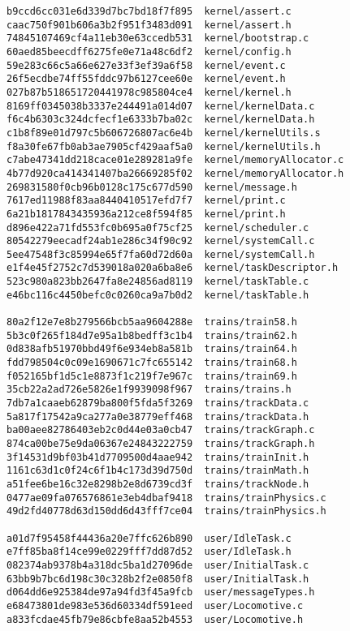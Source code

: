 \documentclass[twoside,a4paper]{refart}
\begin{document}
\begin{verbatim}
b9ccd6cc031e6d339d7bc7bd18f7f895  kernel/assert.c
caac750f901b606a3b2f951f3483d091  kernel/assert.h
74845107469cf4a11eb30e63ccedb531  kernel/bootstrap.c
60aed85beecdff6275fe0e71a48c6df2  kernel/config.h
59e283c66c5a66e627e33f3ef39a6f58  kernel/event.c
26f5ecdbe74ff55fddc97b6127cee60e  kernel/event.h
027b87b518651720441978c985804ce4  kernel/kernel.h
8169ff0345038b3337e244491a014d07  kernel/kernelData.c
f6c4b6303c324dcfecf1e6333b7ba02c  kernel/kernelData.h
c1b8f89e01d797c5b606726807ac6e4b  kernel/kernelUtils.s
f8a30fe67fb0ab3ae7905cf429aaf5a0  kernel/kernelUtils.h
c7abe47341dd218cace01e289281a9fe  kernel/memoryAllocator.c
4b77d920ca414341407ba26669285f02  kernel/memoryAllocator.h
269831580f0cb96b0128c175c677d590  kernel/message.h
7617ed11988f83aa8440410517efd7f7  kernel/print.c
6a21b1817843435936a212ce8f594f85  kernel/print.h
d896e422a71fd553fc0b695a0f75cf25  kernel/scheduler.c
80542279eecadf24ab1e286c34f90c92  kernel/systemCall.c
5ee47548f3c85994e65f7fa60d72d60a  kernel/systemCall.h
e1f4e45f2752c7d539018a020a6ba8e6  kernel/taskDescriptor.h
523c980a823bb2647fa8e24856ad8119  kernel/taskTable.c
e46bc116c4450befc0c0260ca9a7b0d2  kernel/taskTable.h

80a2f12e7e8b279566bcb5aa9604288e  trains/train58.h
5b3c0f265f184d7e95a1b8bedff3c1b4  trains/train62.h
0d838afb51970bbd49f6e934eb8a581b  trains/train64.h
fdd798504c0c09e1690671c7fc655142  trains/train68.h
f052165bf1d5c1e8873f1c219f7e967c  trains/train69.h
35cb22a2ad726e5826e1f9939098f967  trains/trains.h
7db7a1caaeb62879ba800f5fda5f3269  trains/trackData.c
5a817f17542a9ca277a0e38779eff468  trains/trackData.h
ba00aee82786403eb2c0d44e03a0cb47  trains/trackGraph.c
874ca00be75e9da06367e24843222759  trains/trackGraph.h
3f14531d9bf03b41d7709500d4aae942  trains/trainInit.h
1161c63d1c0f24c6f1b4c173d39d750d  trains/trainMath.h
a51fee6be16c32e8298b2e8d6739cd3f  trains/trackNode.h
0477ae09fa076576861e3eb4dbaf9418  trains/trainPhysics.c
49d2fd40778d63d150dd6d43fff7ce04  trains/trainPhysics.h

a01d7f95458f44436a20e7ffc626b890  user/IdleTask.c
e7ff85ba8f14ce99e0229fff7dd87d52  user/IdleTask.h
082374ab9378b4a318dc5ba1d27096de  user/InitialTask.c
63bb9b7bc6d198c30c328b2f2e0850f8  user/InitialTask.h
d064dd6e925384de97a94fd3f45a9fcb  user/messageTypes.h
e68473801de983e536d60334df591eed  user/Locomotive.c
a833fcdae45fb79e86cbfe8aa52b4553  user/Locomotive.h


\end{verbatim}
\end{document}
